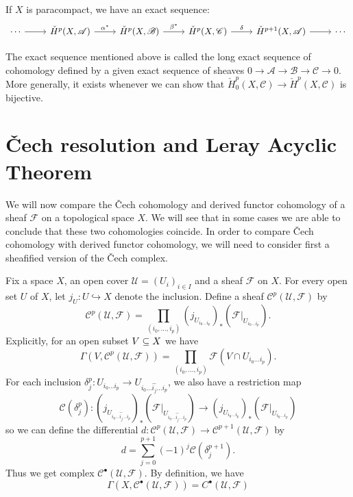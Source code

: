 \begin{corollary}\label{Cech long exact seq paracompact}
If $X$ is paracompact, we have an exact sequence:
\[\begin{tikzcd}
\cdots\ar[r]&\check{H}^p(X,\mathscr{A})\ar[r,"\alpha^*"]&\check{H}^p(X,\mathscr{B})\ar[r,"\beta^*"]&\check{H}^p(X,\mathscr{C})\ar[r,"\delta"]&\check{H}^{p+1}(X,\mathscr{A})\ar[r]&\cdots
\end{tikzcd}\]
\end{corollary}
The exact sequence mentioned above is called the long exact sequence of cohomology defined by a given exact sequence of sheaves $0\to\mathscr{A}\to\mathscr{B}\to\mathscr{C}\to 0$. More generally, it exists whenever we can show that $\check{H}^p_0(X,\mathscr{C})\to\check{H}^p(X,\mathscr{C})$ is bijective.
\section{\v{C}ech resolution and Leray Acyclic Theorem}
We will now compare the \v{C}ech cohomology and derived functor cohomology of
a sheaf $\mathscr{F}$ on a topological space $X$. We will see that in some cases we are able to conclude that these two cohomologies coincide. In order to compare \v{C}ech cohomology with derived functor cohomology, we
will need to consider first a sheafified version of the \v{C}ech complex.\par
Fix a space $X$, an open cover $\mathcal{U}=(U_i)_{i\in I}$ and a sheaf $\mathscr{F}$ on $X$. For every open set $U$ of $X$, let $j_U:U\hookrightarrow X$ denote the inclusion. Define a sheaf $\mathscr{C}^p(\mathcal{U},\mathscr{F})$ by
\[\mathscr{C}^p(\mathcal{U},\mathscr{F})=\prod_{(i_0,\dots,i_p)}(j_{U_{i_0\dots i_p}})_*(\mathscr{F}|_{U_{i_0\dots i_p}}).\]
Explicitly, for an open subset $V\subseteq X$ we have
\[\Gamma(V,\mathscr{C}^p(\mathcal{U},\mathscr{F}))=\prod_{(i_0,\dots,i_p)}\mathscr{F}(V\cap U_{i_0\dots i_p}).\]
For each inclusion $\delta^p_j:U_{i_0\dots i_p}\to U_{i_0\dots\widehat{i_j}\dots i_p}$, we also have a restriction map
\[\mathscr{C}(\delta^p_j):(j_{U_{i_0\dots\widehat{i_j}\dots i_p}})_*(\mathscr{F}|_{U_{i_0\dots\widehat{i_j}\dots i_p}})\to(j_{U_{i_0\dots i_p}})_*(\mathscr{F}|_{U_{i_0\dots i_p}})\]
so we can define the differential $d:\mathscr{C}^p(\mathcal{U},\mathscr{F})\to\mathscr{C}^{p+1}(\mathcal{U},\mathscr{F})$ by
\[d=\sum_{j=0}^{p+1}(-1)^j\mathscr{C}(\delta^{p+1}_j).\]
Thus we get complex $\mathscr{C}^\bullet(\mathcal{U},\mathscr{F})$. By definition, we have
\[\Gamma(X,\mathscr{C}^\bullet(\mathcal{U},\mathscr{F}))=C^\bullet(\mathcal{U},\mathscr{F})\]
